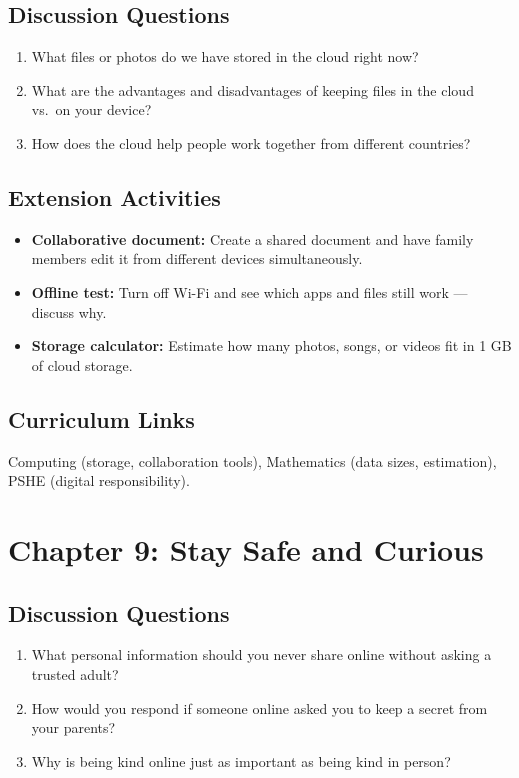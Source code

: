 \subsection*{Discussion Questions}
\begin{enumerate}
  \item What files or photos do we have stored in the cloud right now?
  \item What are the advantages and disadvantages of keeping files in the cloud vs.\ on your device?
  \item How does the cloud help people work together from different countries?
\end{enumerate}

\subsection*{Extension Activities}
\begin{itemize}
  \item \textbf{Collaborative document:} Create a shared document and have family members edit it from different devices simultaneously.
  \item \textbf{Offline test:} Turn off Wi-Fi and see which apps and files still work — discuss why.
  \item \textbf{Storage calculator:} Estimate how many photos, songs, or videos fit in 1 GB of cloud storage.
\end{itemize}

\subsection*{Curriculum Links}
Computing (storage, collaboration tools), Mathematics (data sizes, estimation), PSHE (digital responsibility).

\sectionrule

\section*{Chapter 9: Stay Safe and Curious}

\subsection*{Discussion Questions}
\begin{enumerate}
  \item What personal information should you never share online without asking a trusted adult?
  \item How would you respond if someone online asked you to keep a secret from your parents?
  \item Why is being kind online just as important as being kind in person?
\end{enumerate}

